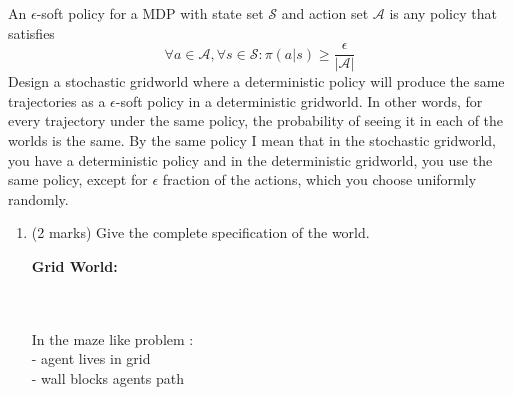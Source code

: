 \documentclass[addpoints,12pt,solution]{exam}
\begin{document}
\begin{questions}
\question[4] An $\epsilon$-soft policy for a MDP with state set $\mathcal{S}$ and action set $\mathcal{A}$ is any policy that satisfies \[\forall a\in \mathcal{A}, \forall s \in \mathcal{S}: \pi(a|s)\geq \frac{\epsilon}{|\mathcal{A}|}\]
Design a stochastic gridworld where a deterministic policy will produce
the same trajectories as a $\epsilon$-soft policy in a deterministic
gridworld. In other words, for every trajectory under the same policy, the
probability of seeing it in each of the worlds is the same. By the same policy I mean that in the stochastic gridworld, you have a deterministic policy and in the deterministic gridworld, you use the same policy, except for $\epsilon$ fraction of
the actions, which you choose uniformly randomly. 
\begin{enumerate}[label=(\alph*)]
\item (2 marks) Give the complete specification of the world.


\begin{solution}
\textbf{Grid World:} \\

\\
\\

 In the maze like problem : \\
 - agent lives in grid \\
 - wall blocks agents path \\
 

\end{solution}
\end{enumerate}
\end{questions}
\end{document}
